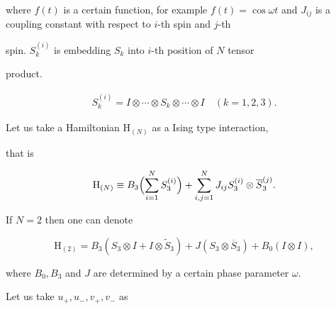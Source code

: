 where $f(t)$ is a certain function, for example $f(t)=\cos\omega t$ and $%

J_{ij}$ is a coupling constant with respect to $i$-th spin and $j$-th

spin. $S_{k}^{(i)}$ is embedding $S_{k}$ into $i$-th position of $N$ tensor

product. 

\begin{eqnarray*}

S_{k}^{(i)}=I\otimes\cdots\otimes S_{k}\otimes\cdots\otimes I \quad  (k=1, 2, 3).

\end{eqnarray*}



Let us take a Hamiltonian $\mathrm{H}_{(N)}$ as a Ising type interaction,

that is 

\[

\mathrm{H}_{(N)}\equiv

B_{3}\Bigl(\sum_{i=1}^{N}S_{3}^{(i)}\Bigr)+\sum_{i,j=1}^{N}J_{ij}S_{3}^{(i)}\otimes 

\overline{S}_{3}^{(j)}. 

\]%

If $N=2$ then one can denote 

\[

\mathrm{H}_{(2)}=B_{3}(S_{3}\otimes I+I\otimes \tilde{S}_{3})+J(S_{3}\otimes 

\overline{S}_{3})+B_{0}(I\otimes I), 

\]%

where $B_{0},B_{3}$ and $J$ are determined by a certain phase parameter $%

\omega $.



Let us take $u_{+},u_{-},v_{+},v_{-}$ as 

